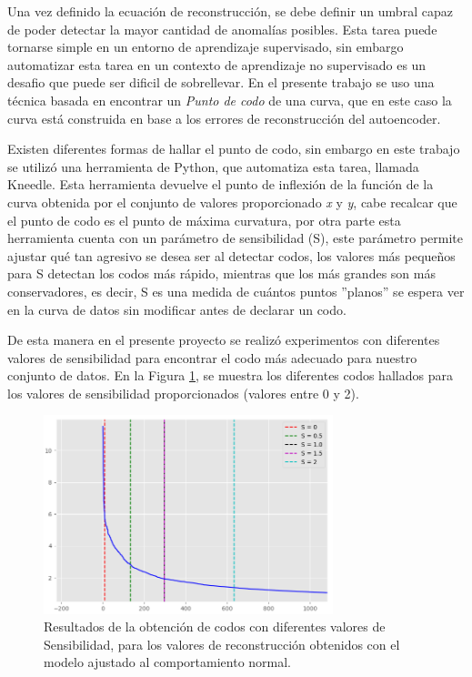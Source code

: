 Una vez definido la ecuaci\'{o}n de reconstrucci\'{o}n, se debe definir un umbral capaz de poder detectar la mayor cantidad de anomal\'{i}as posibles. Esta tarea puede tornarse simple en un entorno de aprendizaje supervisado, sin embargo automatizar esta tarea en un contexto de aprendizaje no supervisado es un desafio que puede ser dificil de sobrellevar. En el presente trabajo se uso una t\'{e}cnica basada en encontrar un \textit{Punto de codo} de una curva, que en este caso la curva est\'{a} construida en base a los errores de reconstrucci\'{o}n del autoencoder.

\vspace{5mm} %

Existen diferentes formas de hallar el punto de codo, sin embargo en este trabajo se utiliz\'{o} una herramienta de Python, que automatiza esta tarea, llamada Kneedle. Esta herramienta devuelve el punto de inflexi\'{o}n de la funci\'{o}n de la curva obtenida por el conjunto de valores proporcionado \textit{x} y \textit{y}, cabe recalcar que el punto de codo es el punto de m\'{a}xima curvatura, por otra parte esta herramienta cuenta con un par\'{a}metro de sensibilidad (S), este par\'{a}metro permite ajustar qu\'{e} tan agresivo se desea ser al detectar codos, los valores m\'{a}s peque\~{n}os para S detectan los codos m\'{a}s r\'{a}pido, mientras que los m\'{a}s grandes son m\'{a}s conservadores, es decir, S es una medida de cu\'{a}ntos puntos ''planos'' se espera ver en la curva de datos sin modificar antes de declarar un codo.

\vspace{5mm} %

De esta manera en el presente proyecto se realiz\'{o} experimentos con diferentes valores de sensibilidad para encontrar el codo m\'{a}s adecuado para nuestro conjunto de datos. En la Figura \ref{fig:zoom_codos}, se muestra los diferentes codos hallados para los valores de sensibilidad proporcionados (valores entre 0 y 2).

\begin{figure}[H]
        \centering
            \includegraphics[width=0.75\textwidth, frame]{imagenes/Cap5/zoom_codos}
        \caption{Resultados de la obtenci\'{o}n de codos con diferentes valores de Sensibilidad, para los valores de reconstrucci\'{o}n obtenidos con el modelo ajustado al comportamiento normal.}
		\label{fig:zoom_codos}
\end{figure}

